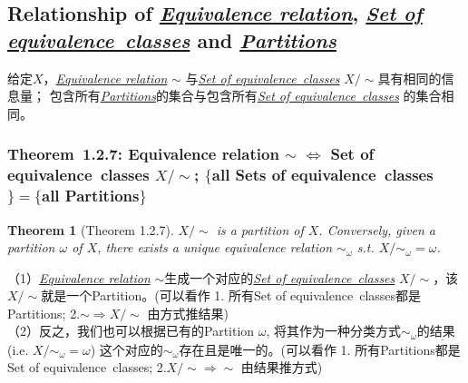 \documentclass[11pt,a4paper]{article}
\newtheorem{theorem}{Theorem}
\begin{document}
\subsection{Relationship of \underline{\textit{Equivalence relation}}, \underline{\textit{Set of equivalence classes}} and \underline{\textit{Partitions}}}
给定$X$，\underline{\textit{Equivalence relation}} $\sim$ 与\underline{\textit{Set of equivalence classes}} $X/\sim$具有相同的信息量；
包含所有\underline{\textit{Partitions}}的集合与包含所有\underline{\textit{Set of equivalence classes}} 的集合相同。

\subsubsection{Theorem 1.2.7: Equivalence relation $\sim$ $\Leftrightarrow$ Set of equivalence classes $X/\sim$; $\{$all Sets of equivalence classes$\}=\{$all Partitions$\}$}
\begin{theorem}[Theorem 1.2.7]
    $X/\sim$ is a partition of $X$. Conversely, given a partition $\omega$ of $X$, there exists a unique equivalence relation $\sim_\omega$ s.t. $X/\sim_\omega=\omega$.\\
\end{theorem}
（1）\underline{\textit{Equivalence relation}} $\sim$生成一个对应的\underline{\textit{Set of equivalence classes}} $X/\sim$，该$X/\sim$就是一个Partition。(可以看作 1. 所有Set of equivalence classes都是 Partitions; 2.$\sim \Rightarrow X/\sim$ 由方式推结果)\\
（2）反之，我们也可以根据已有的Partition $\omega$, 将其作为一种分类方式$\sim_{\omega}$的$\underline{结果}$(i.e. $X/\sim_\omega=\omega$) 这个对应的$\sim_{\omega}$存在且是唯一的。(可以看作 1. 所有Partitions都是 Set of equivalence classes; 2.$X/\sim\Rightarrow\sim$ 由结果推方式)
\end{document}
